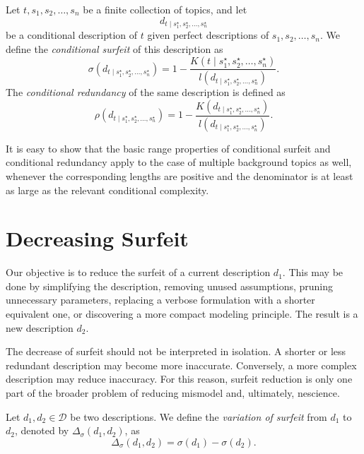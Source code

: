 \begin{definition}
Let \(t,s_1,s_2,\ldots,s_n\) be a finite collection of topics, and let
\[
d_{t\mid s_1^\star,s_2^\star,\ldots,s_n^\star}
\]
be a conditional description of \(t\) given perfect descriptions of \(s_1,s_2,\ldots,s_n\). We define the \emph{conditional surfeit} of this description as
\[
\sigma(d_{t\mid s_1^\star,s_2^\star,\ldots,s_n^\star})
=
1-\frac{
K(t\mid s_1^\star,s_2^\star,\ldots,s_n^\star)
}{
l(d_{t\mid s_1^\star,s_2^\star,\ldots,s_n^\star})
}.
\]
The \emph{conditional redundancy} of the same description is defined as
\[
\rho(d_{t\mid s_1^\star,s_2^\star,\ldots,s_n^\star})
=
1-\frac{
K(d_{t\mid s_1^\star,s_2^\star,\ldots,s_n^\star})
}{
l(d_{t\mid s_1^\star,s_2^\star,\ldots,s_n^\star})
}.
\]
\end{definition}

It is easy to show that the basic range properties of conditional surfeit and conditional redundancy apply to the case of multiple background topics as well, whenever the corresponding lengths are positive and the denominator is at least as large as the relevant conditional complexity.

%
%

\section{Decreasing Surfeit}
\label{sec:decreasing_surfeit}

Our objective is to reduce the surfeit of a current description \(d_1\). This may be done by simplifying the description, removing unused assumptions, pruning unnecessary parameters, replacing a verbose formulation with a shorter equivalent one, or discovering a more compact modeling principle. The result is a new description \(d_2\).

The decrease of surfeit should not be interpreted in isolation. A shorter or less redundant description may become more inaccurate. Conversely, a more complex description may reduce inaccuracy. For this reason, surfeit reduction is only one part of the broader problem of reducing mismodel and, ultimately, nescience.

\begin{definition}
Let \(d_1,d_2\in\mathcal D\) be two descriptions. We define the \emph{variation of surfeit} from \(d_1\) to \(d_2\), denoted by \(\Delta_\sigma(d_1,d_2)\), as
\[
\Delta_\sigma(d_1,d_2)=\sigma(d_1)-\sigma(d_2).
\]
\end{definition}


